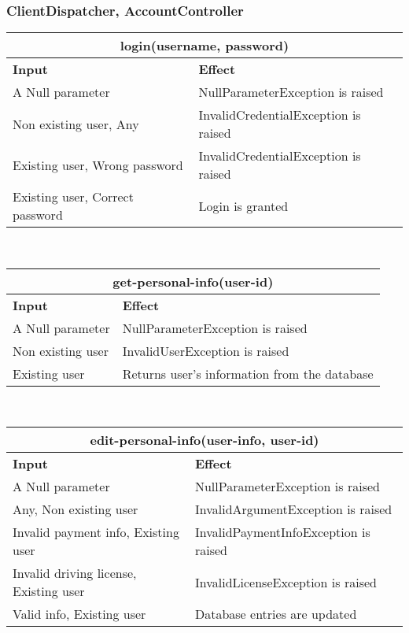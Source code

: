 \subsubsection{ClientDispatcher, AccountController}
\begin{tabular}{|p{5cm}|p{7cm}|}
\hline
\multicolumn{2}{|c|}{login(username, password)} \\
\hline
\textbf{Input} & \textbf{Effect} \\

\hline
A Null parameter & NullParameterException is raised \\

\hline
Non existing user, Any & InvalidCredentialException is raised \\

\hline
Existing user, Wrong password & InvalidCredentialException is raised \\

\hline
Existing user, Correct password & Login is granted \\
\hline
\end{tabular}
\\
\begin{tabular}{|p{5cm}|p{7cm}|}
\hline
\multicolumn{2}{|c|}{get-personal-info(user-id)} \\
\hline
\textbf{Input} & \textbf{Effect} \\

\hline
A Null parameter & NullParameterException is raised \\

\hline
Non existing user & InvalidUserException is raised \\

\hline
Existing user & Returns user’s information from the database \\
\hline
\end{tabular}
\\
\begin{tabular}{|p{5cm}|p{7cm}|}
\hline
\multicolumn{2}{|c|}{edit-personal-info(user-info, user-id)} \\
\hline
\textbf{Input} & \textbf{Effect} \\

\hline
A Null parameter & NullParameterException is raised \\

\hline
Any, Non existing user & InvalidArgumentException is raised \\

\hline
Invalid payment info, Existing user & InvalidPaymentInfoException is raised \\

\hline
Invalid driving license, Existing user & InvalidLicenseException is raised \\

\hline
Valid info, Existing user & Database entries are updated \\
\hline
\end{tabular}

